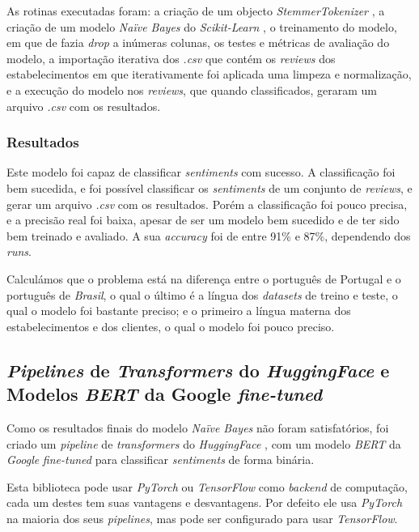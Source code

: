 As rotinas executadas foram: a criação de um objecto \textit{StemmerTokenizer} \cite{skl1}, a criação de um modelo \textit{Naïve Bayes} do \textit{Scikit-Learn} \cite{skl1}, o treinamento do modelo, em que de fazia \textit{drop} a inúmeras colunas, os testes e métricas de avaliação do modelo, a importação iterativa dos \textit{.csv} que contém os \textit{reviews} dos estabelecimentos em que iterativamente foi aplicada uma limpeza e normalização, e a execução do modelo nos \textit{reviews}, que quando classificados, geraram um arquivo \textit{.csv} com os resultados.

\subsubsection{Resultados}

Este modelo foi capaz de classificar \textit{sentiments} com sucesso. A classificação foi bem sucedida, e foi possível classificar os \textit{sentiments} de um conjunto de \textit{reviews}, e gerar um arquivo \textit{.csv} com os resultados. Porém a classificação foi pouco precisa, e a precisão real foi baixa, apesar de ser um modelo bem sucedido e de ter sido bem treinado e avaliado. A sua \textit{accuracy} foi de entre 91\% e 87\%, dependendo dos \textit{runs}.

Calculámos que o problema está na diferença entre o português de Portugal e o português de \textit{Brasil}, o qual o último é a língua dos \textit{datasets} de treino e teste, o qual o modelo foi bastante preciso; e o primeiro a língua materna dos estabelecimentos e dos clientes, o qual o modelo foi pouco preciso.

\subsection{\textit{Pipelines} de \textit{Transformers} do \textit{HuggingFace} e Modelos \textit{BERT} da Google \textit{fine-tuned}}

Como os resultados finais do modelo \textit{Naïve Bayes} não foram satisfatórios, foi criado um \textit{pipeline} de \textit{transformers} do \textit{HuggingFace} \cite{yt2}, com um modelo \textit{BERT} da \textit{Google} \textit{fine-tuned} para classificar \textit{sentiments} de forma binária.

Esta biblioteca pode usar \textit{PyTorch} ou \textit{TensorFlow} como \textit{backend} de computação, cada um destes tem suas vantagens e desvantagens. Por defeito ele usa \textit{PyTorch} na maioria dos seus \textit{pipelines}, mas pode ser configurado para usar \textit{TensorFlow}.


